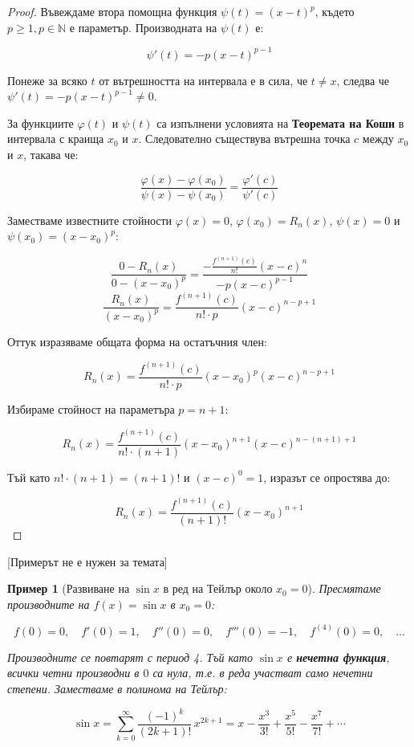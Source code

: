 \documentclass{scrartcl}
\newtheorem{example}{Пример}
\begin{document}
\begin{FlushLeft}
\begin{proof}
Въвеждаме втора помощна функция $\psi(t) = (x - t)^p$, където $p \ge 1, p \in \mathbb{N}$ е параметър. Производната на $\psi(t)$ е:

\[ \psi'(t) = -p(x - t)^{p-1} \]

Понеже за всяко $t$ от вътрешността на интервала е в сила, че $t \neq x$, следва че $\psi'(t) = -p(x-t)^{p-1} \neq 0$.

За функциите $\varphi(t)$ и $\psi(t)$ са изпълнени условията на \textbf{Теоремата на Коши} в интервала с краища $x_0$ и $x$. Следователно съществува вътрешна точка $c$ между $x_0$ и $x$, такава че:

\[ \frac{\varphi(x) - \varphi(x_0)}{\psi(x) - \psi(x_0)} = \frac{\varphi'(c)}{\psi'(c)} \]

Заместваме известните стойности $\varphi(x) = 0$, $\varphi(x_0) = R_n(x)$, $\psi(x) = 0$ и $\psi(x_0) = (x - x_0)^p$:

\[ \frac{0 - R_n(x)}{0 - (x - x_0)^p} = \frac{-\frac{f^{(n+1)}(c)}{n!}(x - c)^n}{-p(x - c)^{p-1}} \]
\[ \frac{R_n(x)}{(x - x_0)^p} = \frac{f^{(n+1)}(c)}{n! \cdot p} (x - c)^{n - p + 1} \]

Оттук изразяваме общата форма на остатъчния член:

\[ R_n(x) = \frac{f^{(n+1)}(c)}{n! \cdot p} (x - x_0)^p (x - c)^{n - p + 1} \]

Избираме стойност на параметъра $p = n + 1$:

\[ R_n(x) = \frac{f^{(n+1)}(c)}{n! \cdot (n + 1)} (x - x_0)^{n+1} (x - c)^{n - (n+1) + 1} \]

Тъй като $n! \cdot (n+1) = (n+1)!$ и $(x - c)^0 = 1$, изразът се опростява до:

\[ R_n(x) = \frac{f^{(n+1)}(c)}{(n+1)!}(x - x_0)^{n+1} \]
\end{proof}

[Примерът не е нужен за темата]
\begin{example}[Развиване на $\sin x$ в ред на Тейлър около $x_0 = 0$]
Пресмятаме производните на $f(x) = \sin x$ в $x_0 = 0$:

\[
f(0)=0,\quad f'(0)=1,\quad f''(0)=0,\quad f'''(0)=-1,\quad f^{(4)}(0)=0,\quad \ldots
\]

Производните се повтарят с период 4. Тъй като $\sin x$ е \textbf{нечетна функция}, всички четни производни в $0$ са нула, т.е. в реда участват само нечетни степени. Заместваме в полинома на Тейлър:

\[
\sin x = \sum_{k=0}^{\infty} \frac{(-1)^k}{(2k+1)!}\, x^{2k+1}
       = x - \frac{x^3}{3!} + \frac{x^5}{5!} - \frac{x^7}{7!} + \cdots
\]


\end{example}
\end{FlushLeft}
\end{document}
